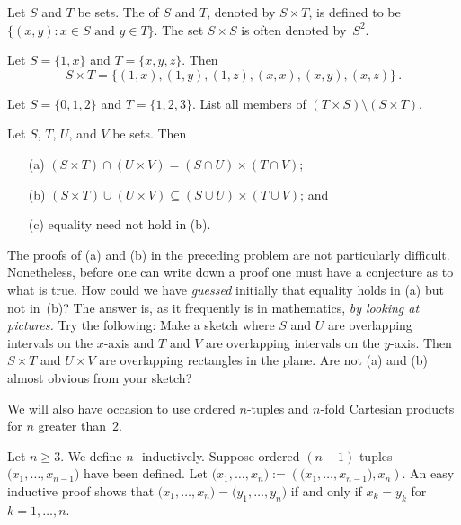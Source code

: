 \begin{defn} Let $S$ and $T$ be sets.  The
 of $S$ and $T$, denoted by $S \times T$, is defined to be
$\{(x,y)\colon x \in S \text{ and } y \in T\}$.  The set $S \times S$ is often denoted
by~$S^2$.
\end{defn}

\begin{exam} Let $S = \{1,x\}$ and $T = \{x,y,z\}$.  Then
  \[ S \times T = \{(1,x), (1,y), (1,z), (x,x), (x,y), (x,z)\}\,. \]
\end{exam}

\begin{prob} Let $S = \{0,1,2\}$ and $T = \{1,2,3\}$.  List all members of
$(T \times S) \setminus (S \times T)$.
\end{prob}

\begin{prob} Let $S$, $T$, $U$, and $V$ be sets.  Then
 \begin{enumerate}
   \item[(a)] $(S \times T) \cap (U \times V) = (S \cap U) \times (T \cap V)$;
   \item[(b)] $(S \times T) \cup (U \times V) \subseteq (S \cup U)
        \times (T \cup V)$; and
   \item[(c)] equality need not hold in (b).
 \end{enumerate}
\end{prob}

The proofs of (a) and (b) in the preceding problem are not particularly difficult.
Nonetheless, before one can write down a proof one must have a conjecture as to what is true.
How could we have \emph{guessed} initially that equality holds in (a) but not in~(b)?  The
answer is, as it frequently is in mathematics, \emph{by looking at pictures.}  Try the
following:  Make a sketch where $S$ and $U$ are overlapping intervals on the $x$-axis and $T$
and $V$ are overlapping intervals on the $y$-axis.  Then $S \times T$ and $U \times V$ are
overlapping rectangles in the plane.  Are not (a) and (b) almost obvious from your sketch?

We will also have occasion to use ordered $n$-tuples and $n$-fold Cartesian products for $n$
greater than~$2$.

\begin{defn}\label{triple} Let $n \ge 3$.  We define
 $n$- inductively.  Suppose ordered $(n-1)$-tuples
$\bigl(x_1,\dots,x_{n-1}\bigr)$ have been defined. Let $\bigl(x_1,\dots,x_n\bigr) :=
\left(\bigl(x_1,\dots,x_{n-1}\bigr),x_n\right)$. An easy inductive proof shows that
$\bigl(x_1,\dots,x_n\bigr) = \bigl(y_1,\dots,y_n\bigr)$ if and only if $x_k = y_k$ for $k = 1,
\dots, n$.
\end{defn}

